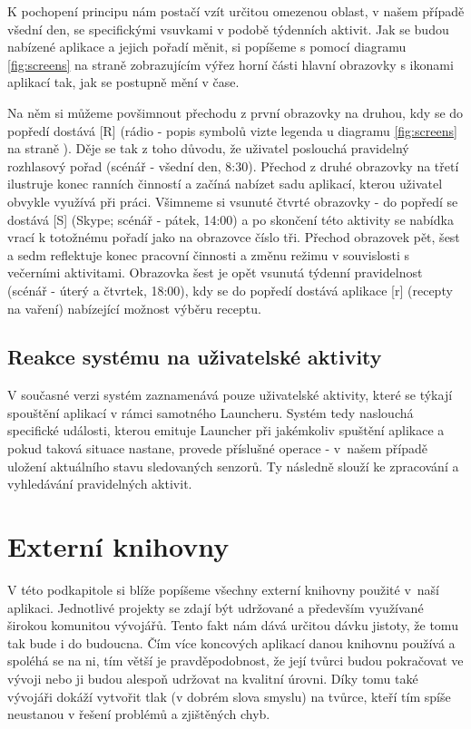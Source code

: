 \documentclass[thesis=M,czech]{FITthesis}[2012/06/26]
\begin{document}
K pochopení principu nám postačí vzít určitou omezenou oblast, v našem případě všední den, se specifickými vsuvkami v podobě týdenních aktivit. Jak se budou nabízené aplikace a jejich pořadí měnit, si popíšeme s pomocí diagramu \ref{fig:screens} na straně \pageref{fig:screens} zobrazujícím výřez horní části hlavní obrazovky s ikonami aplikací tak, jak se postupně mění v čase.

Na něm si můžeme povšimnout přechodu z první obrazovky na druhou, kdy se do popředí dostává [R] (rádio - popis symbolů vizte legenda u diagramu \ref{fig:screens} na straně \pageref{fig:screens}). Děje se tak z toho důvodu, že uživatel poslouchá pravidelný rozhlasový pořad (scénář - všední den, 8:30). Přechod z druhé obrazovky na třetí ilustruje konec ranních činností a začíná nabízet sadu aplikací, kterou uživatel obvykle využívá při práci. Všimneme si vsunuté čtvrté obrazovky - do popředí se dostává [S] (Skype; scénář - pátek, 14:00) a po skončení této aktivity se nabídka vrací k totožnému pořadí jako na obrazovce číslo tři. Přechod obrazovek pět, šest a sedm reflektuje konec pracovní činnosti a změnu režimu v souvislosti s večerními aktivitami. Obrazovka šest je opět vsunutá týdenní pravidelnost (scénář - úterý a čtvrtek, 18:00), kdy se do popředí dostává aplikace [r] (recepty na vaření) nabízející možnost výběru receptu.

\subsection{Reakce systému na uživatelské aktivity}
V současné verzi systém zaznamenává pouze uživatelské aktivity, které se týkají spouštění aplikací v rámci samotného Launcheru. Systém tedy naslouchá specifické události, kterou emituje Launcher při jakémkoliv spuštění aplikace a pokud taková situace nastane, provede příslušné operace - v~našem případě uložení aktuálního stavu sledovaných senzorů. Ty následně slouží ke zpracování a vyhledávání pravidelných aktivit.

\section{Externí knihovny}
V této podkapitole si blíže popíšeme všechny externí knihovny použité v~naší aplikaci. Jednotlivé projekty se zdají být udržované a především využívané širokou komunitou vývojářů. Tento fakt nám dává určitou dávku jistoty, že tomu tak bude i do budoucna. Čím více koncových aplikací danou knihovnu používá a spoléhá se na ni, tím větší je pravděpodobnost, že její tvůrci budou pokračovat ve vývoji nebo ji budou alespoň udržovat na kvalitní úrovni. Díky tomu také vývojáři dokáží vytvořit tlak (v dobrém slova smyslu) na tvůrce, kteří tím spíše neustanou v řešení problémů a zjištěných chyb.
\end{document}
